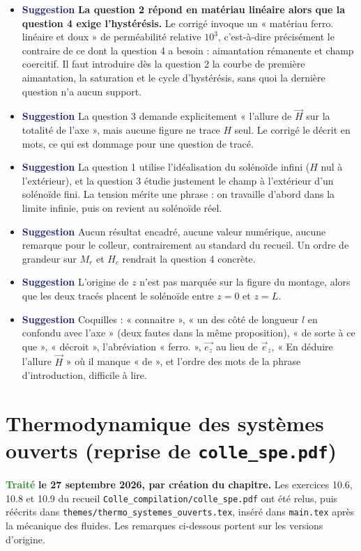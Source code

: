 \documentclass[a4paper,11pt]{article}
\newcommand{\suggestion}{\textcolor{MidnightBlue}{\textbf{Suggestion}}}
\newcommand{\traite}{\textcolor{ForestGreen}{\textbf{Traité}}}
\begin{document}
\begin{itemize}
	\item \suggestion{} \textbf{La question 2 répond en matériau linéaire alors que la question 4 exige
	l'hystérésis.} Le corrigé invoque un « matériau ferro. linéaire et doux » de perméabilité relative
	$10^{3}$, c'est-à-dire précisément le contraire de ce dont la question 4 a besoin : aimantation
	rémanente et champ coercitif. Il faut introduire dès la question 2 la courbe de première
	aimantation, la saturation et le cycle d'hystérésis, sans quoi la dernière question n'a aucun
	support.
	\item \suggestion{} La question 3 demande explicitement « l'allure de $\vec H$ sur la totalité de
	l'axe », mais aucune figure ne trace $H$ seul. Le corrigé le décrit en mots, ce qui est dommage
	pour une question de tracé.
	\item \suggestion{} La question 1 utilise l'idéalisation du solénoïde infini ($H$ nul à
	l'extérieur), et la question 3 étudie justement le champ à l'extérieur d'un solénoïde fini. La
	tension mérite une phrase : on travaille d'abord dans la limite infinie, puis on revient au
	solénoïde réel.
	\item \suggestion{} Aucun résultat encadré, aucune valeur numérique, aucune remarque pour le
	colleur, contrairement au standard du recueil. Un ordre de grandeur sur $M_r$ et $H_c$ rendrait la
	question 4 concrète.
	\item \suggestion{} L'origine de $z$ n'est pas marquée sur la figure du montage, alors que les deux
	tracés placent le solénoïde entre $z=0$ et $z=L$.
	\item \suggestion{} Coquilles : « connaitre », « un des côté de longueur $l$ en confondu avec
	l'axe » (deux fautes dans la même proposition), « de sorte à ce que », « décroit », l'abréviation
	« ferro. », $\vec{e_z}$ au lieu de $\vec{e}_z$, « En déduire l'allure $\vec H$ » où il manque
	« de », et l'ordre des mots de la phrase d'introduction, difficile à lire.
\end{itemize}


\section{Thermodynamique des systèmes ouverts (reprise de \texttt{colle\_spe.pdf})}

\traite{} \textbf{le 27 septembre 2026, par création du chapitre.} Les exercices 10.6, 10.8 et
10.9 du recueil \texttt{Colle\_compilation/colle\_spe.pdf} ont été relus, puis réécrits dans
\texttt{themes/thermo\_systemes\_ouverts.tex}, inséré dans \texttt{main.tex} après la mécanique des
fluides. Les remarques ci-dessous portent sur les versions d'origine.
\end{document}
